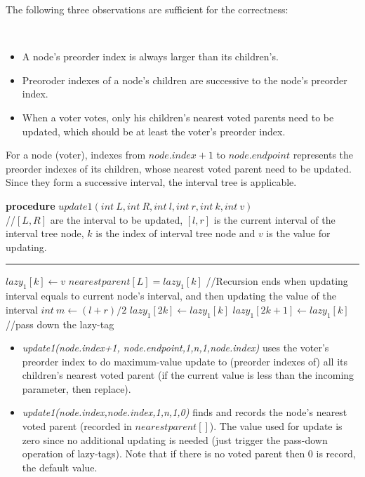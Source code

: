 The following three observations are sufficient for the correctness:
\begin{observation}
\
	\begin{itemize}
	    \item A node's preorder index is always larger than its children's.
	    \item Preoroder indexes of a node's children are successive to the node's preorder index. 
	    \item When a voter votes, only his children's nearest voted parents need to be updated, which should be at least the voter's preorder index.
	\end{itemize}
\end{observation}
For a node (voter), indexes from $node.index+1$ to $node.endpoint$ represents the preorder indexes of its children, whose nearest voted parent need to be updated. Since they form a successive interval, the interval tree is applicable. 
\begin{algorithm}
	\textbf{procedure} $update1(int~L,int ~R, int~l, int~r, int~k, int~v)${\color{gray}
		\\//$[L,R]$ are the interval to be updated, $[l,r]$ is the current interval of the interval tree node, $k$ is the index of  interval tree node and $v$ is the value for updating.}
	\hrule
	{
		 {$lazy_1[k] \leftarrow v$}
		 {$nearestparent[L] = lazy_1[k]$}
		{\color{gray}
			//Recursion ends when updating interval equals to current node's interval, and then updating the value of the interval}
	}
	{
		$int~m \leftarrow (l+r)/2$\;
		 {$lazy_1[2k] \leftarrow lazy_1[k]$}
		 {$lazy_1[2k+1] \leftarrow lazy_1[k]${\color{gray}
				//pass down the lazy-tag}}
	}
\end{algorithm}

\begin{itemize}
	\item {\em update1(node.index+1, node.endpoint,1,n,1,node.index)} uses the voter's preorder index to do maximum-value update to (preorder indexes of) all its children's nearest voted parent (if the current value is less than the incoming parameter, then replace). 
	\item {\em update1(node.index,node.index,1,n,1,0)} finds and records the node's nearest voted parent (recorded in $nearestparent[]$). The value used for update is zero since no additional updating is needed (just trigger the pass-down operation of lazy-tags). Note that if there is no voted parent then 0 is record, the default value. 
\end{itemize}

